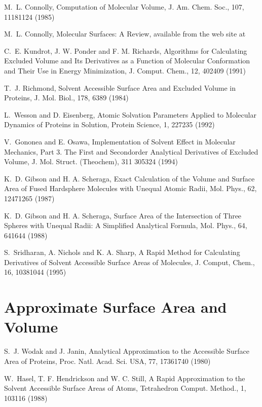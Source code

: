 \documentclass[letterpaper,11pt,english]{sphinxmanual}
\begin{document}
M. L. Connolly, Computation of Molecular Volume, J. Am. Chem. Soc., 107, 1118\sphinxhyphen{}1124 (1985)

M. L. Connolly, Molecular Surfaces: A Review, available from the web site at 

C. E. Kundrot, J. W. Ponder and F. M. Richards, Algorithms for Calculating Excluded Volume and Its Derivatives as a Function of Molecular Conformation and Their Use in Energy Minimization, J. Comput. Chem., 12, 402\sphinxhyphen{}409 (1991)

T. J. Richmond, Solvent Accessible Surface Area and Excluded Volume in Proteins, J. Mol. Biol., 178, 63\sphinxhyphen{}89 (1984)

L. Wesson and D. Eisenberg, Atomic Solvation Parameters Applied to Molecular Dynamics of Proteins in Solution, Protein Science, 1, 227\sphinxhyphen{}235 (1992)

V. Gononea and E. Osawa, Implementation of Solvent Effect in Molecular Mechanics, Part 3. The First\sphinxhyphen{} and Second\sphinxhyphen{}order Analytical Derivatives of Excluded Volume, J. Mol. Struct. (Theochem), 311 305\sphinxhyphen{}324 (1994)

K. D. Gibson and H. A. Scheraga, Exact Calculation of the Volume and Surface Area of Fused Hard\sphinxhyphen{}sphere Molecules with Unequal Atomic Radii, Mol. Phys., 62, 1247\sphinxhyphen{}1265 (1987)

K. D. Gibson and H. A. Scheraga, Surface Area of the Intersection of Three Spheres with Unequal Radii: A Simplified Analytical Formula, Mol. Phys., 64, 641\sphinxhyphen{}644 (1988)

S. Sridharan, A. Nichols and K. A. Sharp, A Rapid Method for Calculating Derivatives of Solvent Accessible Surface Areas of Molecules, J. Comput, Chem., 16, 1038\sphinxhyphen{}1044 (1995)


\section{Approximate Surface Area and Volume}
\label{\detokenize{text/references:approximate-surface-area-and-volume}}
S. J. Wodak and J. Janin, Analytical Approximation to the Accessible Surface Area of Proteins, Proc. Natl. Acad. Sci. USA, 77, 1736\sphinxhyphen{}1740 (1980)

W. Hasel, T. F. Hendrickson and W. C. Still, A Rapid Approximation to the Solvent Accessible Surface Areas of Atoms, Tetrahedron Comput. Method., 1, 103\sphinxhyphen{}116 (1988)
\end{document}
